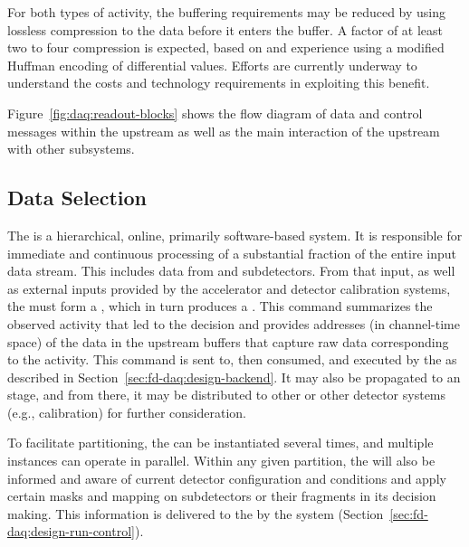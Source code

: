 \begin{itemize}
For both types of activity, the buffering requirements may be reduced by
using lossless compression to the data before it enters the buffer. A
factor of at least two to four compression is expected, based on
 \cite{bib:uBsnreadout2019} 
and  experience using a modified Huffman encoding of
differential  values.  Efforts are currently underway to understand the
costs and technology requirements in exploiting this benefit.

\end{itemize}

Figure~\ref{fig:daq:readout-blocks} shows the flow diagram of data and control messages within the upstream  as well as the main interaction of the upstream  with other subsystems.

\subsection{Data Selection}
\label{sec:sp-daq:design-data-selection}

The   is a hierarchical, online, primarily
software-based system. It is responsible for immediate and continuous processing of a substantial fraction of the entire input data stream. 
This includes data from  and  subdetectors.
From that input, as well as external inputs provided by
the accelerator and detector calibration systems, the  must form a ,
which in turn produces a .
This command summarizes the observed activity that led to the decision
and provides addresses (in channel-time space) of the data in the
upstream  buffers that capture raw data
corresponding to the activity.
This command is sent to, then consumed, and executed by the  as described in Section~\ref{sec:fd-daq:design-backend}. 
It may also be propagated to an  stage, and from there, it may be
distributed to other  or other detector systems
(e.g., calibration) for further consideration.

To facilitate partitioning, the   can be instantiated several times, and multiple instances can operate in parallel. Within any
given partition, the  will also be
informed and aware of current detector configuration and conditions and
apply certain masks and mapping on subdetectors or their fragments in
its decision making. This information is delivered to the
 by the  system (Section~\ref{sec:fd-daq:design-run-control}).

